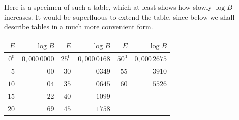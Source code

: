 Here is a specimen of such a table, which at least shows how slowly $\log B$ increases. It would be superfluous to extend the table, since below we shall describe tables in a much more convenient form.
\begin{center}
\begin{tabular}{|r|r||r|r||r|r|}
\hline
$E$ & $\log B$ & $E$ & $\log B$ & $E$ & $\log B$\\
\hline
$0^0$ & $0{,}000\,0000$ & $25^0$ & $0{,}000\,0168$ & $50^0$ & $0{,}000\,2675$\\
$5$ & $00$ & $30$ & $0349$ & $55$ & $3910$\\
$10$ & $04$ & $35$ & $0645$ & $60$ & $5526$\\
$15$ & $22$ & $40$ & $1099$ & & \\
$20$ & $69$ & $45$ & $1758$ & & \\
\hline
\end{tabular}
\end{center}
